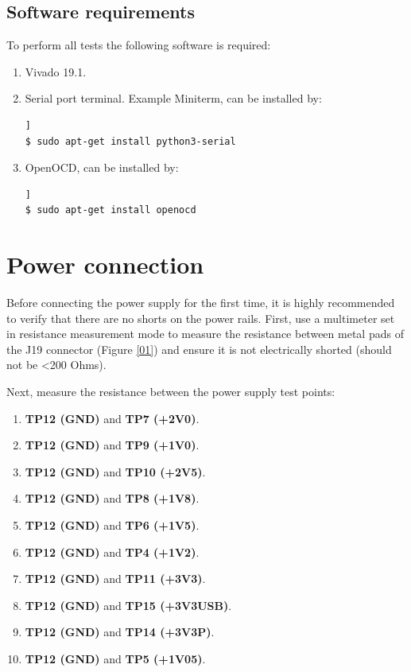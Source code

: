 \documentclass[12pt,oneside,a4]{article}
\begin{document}
\subsection{Software requirements}
To perform all tests the following software is required:
\begin{enumerate}
    \item Vivado 19.1.
    \item Serial port terminal. Example Miniterm, can be installed by:
	\begin{lstlisting}[backgroundcolor = \color{Gainsboro}, language=bash, frame=none]]
$ sudo apt-get install python3-serial
	\end{lstlisting}
	\item OpenOCD, can be installed by:
	\begin{lstlisting}[backgroundcolor = \color{Gainsboro}, language=bash, frame=none]]
$ sudo apt-get install openocd
	\end{lstlisting}
\end{enumerate}

\section{Power connection}\label{sec:Power_Connection}
Before connecting the power supply for the first time, it is highly recommended to verify that there are no shorts on the power rails.
First, use a multimeter set in resistance measurement mode to measure the resistance between metal pads of the J19 connector (Figure \ref{01})
and ensure it is not electrically shorted (should not be <200 Ohms).

Next, measure the resistance between the power supply test points:

\begin{enumerate}
    \item \textbf{TP12 (GND)} and \textbf{TP7 (+2V0)}.
    \item \textbf{TP12 (GND)} and \textbf{TP9 (+1V0)}.
    \item \textbf{TP12 (GND)} and \textbf{TP10 (+2V5)}.
    \item \textbf{TP12 (GND)} and \textbf{TP8 (+1V8)}.
    \item \textbf{TP12 (GND)} and \textbf{TP6 (+1V5)}.
    \item \textbf{TP12 (GND)} and \textbf{TP4 (+1V2)}.
    \item \textbf{TP12 (GND)} and \textbf{TP11 (+3V3)}.
    \item \textbf{TP12 (GND)} and \textbf{TP15 (+3V3USB)}.
    \item \textbf{TP12 (GND)} and \textbf{TP14 (+3V3P)}.
    \item \textbf{TP12 (GND)} and \textbf{TP5 (+1V05)}.
\end{enumerate}
\end{document}
